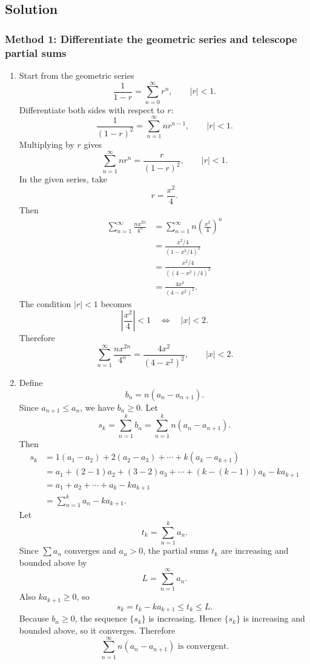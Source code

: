 \documentclass[12pt]{article}
\newcommand{\abs}[1]{\left|#1\right|}
\begin{document}
\newpage
\subsection{Solution}

\subsubsection{Method 1: Differentiate the geometric series and telescope partial sums}

\begin{enumerate}[label=(\alph*)]
\item Start from the geometric series
\[
\frac{1}{1-r}=\sum_{n=0}^{\infty}r^n,
\qquad \abs{r}<1.
\]
Differentiate both sides with respect to $r$:
\[
\frac{1}{(1-r)^2}=\sum_{n=1}^{\infty}n r^{n-1},
\qquad \abs{r}<1.
\]
Multiplying by $r$ gives
\[
\sum_{n=1}^{\infty}n r^n=\frac{r}{(1-r)^2},
\qquad \abs{r}<1.
\]
In the given series, take
\[
r=\frac{x^2}{4}.
\]
Then
\begin{align*}
\sum_{n=1}^{\infty}\frac{nx^{2n}}{4^n}
&=\sum_{n=1}^{\infty}n\left(\frac{x^2}{4}\right)^n \\
&=\frac{x^2/4}{(1-x^2/4)^2} \\
&=\frac{x^2/4}{\left((4-x^2)/4\right)^2} \\
&=\frac{4x^2}{(4-x^2)^2}.
\end{align*}
The condition $\abs{r}<1$ becomes
\[
\abs{\frac{x^2}{4}}<1
\quad\Longleftrightarrow\quad
\abs{x}<2.
\]
Therefore
\[
\boxed{\displaystyle
\sum_{n=1}^{\infty}\frac{nx^{2n}}{4^n}
=\frac{4x^2}{(4-x^2)^2},
\qquad \abs{x}<2.}
\]

\item Define
\[
b_n=n(a_n-a_{n+1}).
\]
Since $a_{n+1}\leq a_n$, we have $b_n\geq 0$. Let
\[
s_k=\sum_{n=1}^k b_n=\sum_{n=1}^k n(a_n-a_{n+1}).
\]
Then
\begin{align*}
s_k
&=1(a_1-a_2)+2(a_2-a_3)+\cdots+k(a_k-a_{k+1}) \\
&=a_1+(2-1)a_2+(3-2)a_3+\cdots+(k-(k-1))a_k-ka_{k+1} \\
&=a_1+a_2+\cdots+a_k-ka_{k+1} \\
&=\sum_{n=1}^k a_n-ka_{k+1}.
\end{align*}
Let
\[
t_k=\sum_{n=1}^k a_n.
\]
Since $\sum a_n$ converges and $a_n>0$, the partial sums $t_k$ are increasing and bounded above by
\[
L=\sum_{n=1}^{\infty}a_n.
\]
Also $ka_{k+1}\geq 0$, so
\[
s_k=t_k-ka_{k+1}\leq t_k\leq L.
\]
Because $b_n\geq 0$, the sequence $\{s_k\}$ is increasing. Hence $\{s_k\}$ is increasing and bounded above, so it converges. Therefore
\[
\boxed{\displaystyle \sum_{n=1}^{\infty}n(a_n-a_{n+1})\text{ is convergent.}}
\]
\end{enumerate}
\end{document}
